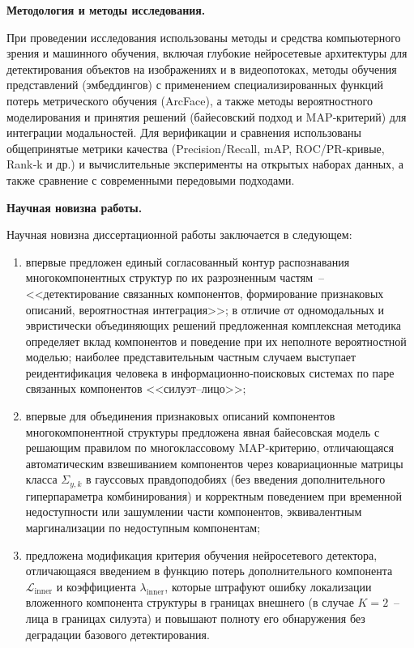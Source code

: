 \textbf{Методология и методы исследования.}

При проведении исследования использованы методы и средства компьютерного зрения
и машинного обучения, включая глубокие нейросетевые архитектуры для
детектирования объектов на изображениях и в видеопотоках, методы обучения
представлений (эмбеддингов) с применением специализированных функций потерь
метрического обучения (ArcFace), а также методы вероятностного моделирования
и принятия решений (байесовский подход и MAP‑критерий) для интеграции
модальностей. Для верификации и сравнения использованы общепринятые метрики
качества (Precision/Recall, mAP, ROC/PR‑кривые, Rank‑k и др.) и вычислительные
эксперименты на открытых наборах данных, а также сравнение с современными
передовыми подходами.

\textbf{Научная новизна работы.}

Научная новизна диссертационной работы заключается в следующем:
\begin{enumerate}
    \item впервые предложен единый согласованный контур распознавания
    многокомпонентных структур по их разрозненным частям~--
    <<детектирование связанных компонентов, формирование признаковых
    описаний, вероятностная интеграция>>; в отличие от одномодальных и
    эвристически объединяющих решений предложенная комплексная методика
    определяет вклад компонентов и поведение при их неполноте вероятностной
    моделью; наиболее представительным частным случаем выступает
    реидентификация человека в информационно‑поисковых системах по паре
    связанных компонентов <<силуэт--лицо>>;

    \item впервые для объединения признаковых описаний компонентов
    многокомпонентной структуры предложена явная байесовская модель с
    решающим правилом по многоклассовому MAP‑критерию, отличающаяся
    автоматическим взвешиванием компонентов через ковариационные матрицы
    класса $\Sigma_{y,k}$ в гауссовых правдоподобиях (без введения
    дополнительного гиперпараметра комбинирования) и корректным поведением
    при временной недоступности или зашумлении части компонентов,
    эквивалентным маргинализации по недоступным компонентам;

    \item предложена модификация критерия обучения нейросетевого детектора,
    отличающаяся введением в функцию потерь дополнительного компонента
    $\mathcal{L}_{\text{inner}}$ и коэффициента $\lambda_{\text{inner}}$,
    которые штрафуют ошибку локализации вложенного компонента структуры в
    границах внешнего (в случае $K=2$~-- лица в границах силуэта) и
    повышают полноту его обнаружения без деградации базового
    детектирования.
\end{enumerate}

